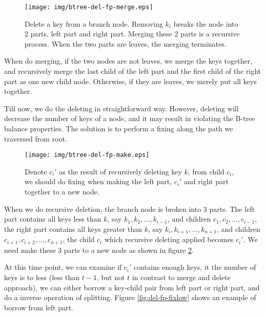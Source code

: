 \documentclass{article}
\begin{document}
\begin{figure}[htbp]
    \begin{center}
      \texttt{[image: img/btree-del-fp-merge.eps]}
      \caption{Delete a key from a branch node. Removing $k_i$ breaks
the node into 2 parts, left part and right part. Merging these 2 parts
is a recursive process. When the two parts are leaves, the merging
terminates.} \label{fig:del-fp-merge}
    \end{center}
\end{figure}

When do merging, if the two nodes are not leaves, we merge the keys
together, and recursively merge the last child of the left part
and the first child of the right part as one new child node. Otherwise,
if they are leaves, we merely put all keys together.

Till now, we do the deleting in straightforward way. However, deleting
will decrease the number of keys of a node, and it may result in 
violating the B-tree balance properties. The solution is to perform a 
fixing along the path we traversed from root.

\begin{figure}[htbp]
    \begin{center}
      \texttt{[image: img/btree-del-fp-make.eps]}
      \caption{Denote $c_i'$ as the result of recursively deleting 
key $k$, from child $c_i$, we should do fixing when making the 
left part, $c_i'$ and right part together to a new node.} \label{fig:del-fp-make}
    \end{center}
\end{figure}

When we do recursive deletion, the branch node is broken into 3 parts.
The left part contains all keys less than $k$, say $k_1, k_2, ..., k_{i-1}$,
and children $c_1, c_2, ..., c_{i-1}$, the right part contains all keys
greater than $k$, say $k_i, k_{i+1}, ..., k_{n+1}$, and children
$c_{i+1}, c_{i+2}, ..., c_{n+1}$, the child $c_i$ which recursive deleting
applied becomes $c_i'$. We need make these 3 parts to a new node
as shown in figure \ref{fig:del-fp-make}.

At this time point, we can examine if $c_i'$ contains enough keys,
it the number of keys is to less (less than $t-1$, but not $t$ in 
contrast to merge and delete approach), we can either borrow a key-child
pair from left part or right part, and do a inverse operation of
splitting. Figure \ref{fig:del-fp-fixlow} shows an example of borrow from left part.
\end{document}
